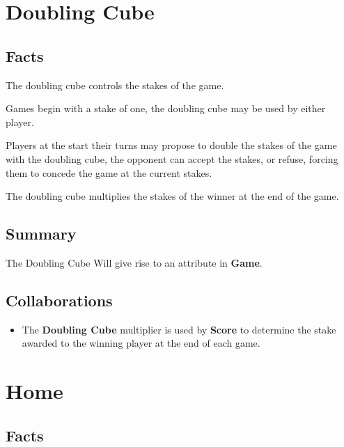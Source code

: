 \documentclass{report}
\begin{document}
    \newpage
    \section{Doubling Cube}

    \subsection{Facts}

    \begin{dashed}
        \item The doubling cube controls the stakes of the game.
        \item Games begin with a stake of one, the doubling cube may be used by either player.
        \item Players at the start their turns may propose to double the stakes of the game
        with the doubling cube, the opponent can accept the stakes, or refuse, forcing them
        to concede the game at the current stakes.
        \item The doubling cube multiplies the stakes of the winner at the end of the game.
    \end{dashed}

    \subsection{Summary}
    The Doubling Cube Will give rise to an attribute in \textbf{Game}.

    \subsection{Collaborations}

    \begin{itemize}
        \item The \textbf{Doubling Cube} multiplier is used by \textbf{Score} to determine the stake awarded to the winning player at the end of each game.
    \end{itemize}





    \newpage
    \section{Home}

    \subsection{Facts}
\end{document}

